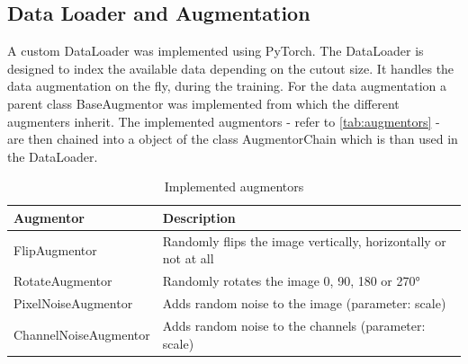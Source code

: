 \subsection{Data Loader and Augmentation}%

A custom DataLoader was implemented using PyTorch. The DataLoader is designed to index the available data
depending on the cutout size. It handles the data augmentation on the fly, during the training.
For the data augmentation a parent class BaseAugmentor was implemented from which the different augmenters inherit. The implemented augmentors -
refer to \autoref{tab:augmentors} - are then chained into a object of the class AugmentorChain
which is than used in the DataLoader.

\begin{table}[H]
    \centering
    \begin{tabular}{|l|l|}
        \hline
        \textbf{Augmentor} & \textbf{Description} \\
        \hline
        FlipAugmentor & Randomly flips the image vertically, horizontally or not at all \\
        RotateAugmentor & Randomly rotates the image 0, 90, 180 or 270° \\
        PixelNoiseAugmentor & Adds random noise to the image (parameter: scale) \\
        ChannelNoiseAugmentor & Adds random noise to the channels (parameter: scale) \\
        \hline
    \end{tabular}
    \caption{Implemented augmentors}
    \label{tab:augmentors}
\end{table}
